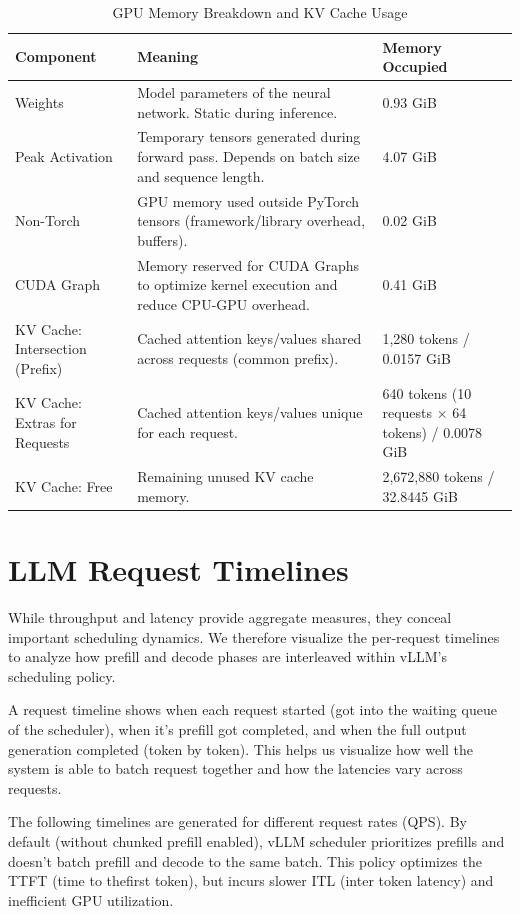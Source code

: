 \begin{table}[H]
\centering
\begin{tabular}{|p{4cm}|p{8cm}|p{3cm}|}
\hline
\textbf{Component} & \textbf{Meaning} & \textbf{Memory Occupied} \\
\hline
Weights & Model parameters of the neural network. Static during inference. & 0.93 GiB \\
\hline
Peak Activation & Temporary tensors generated during forward pass. Depends on batch size and sequence length. & 4.07 GiB \\
\hline
Non-Torch & GPU memory used outside PyTorch tensors (framework/library overhead, buffers). & 0.02 GiB \\
\hline
CUDA Graph & Memory reserved for CUDA Graphs to optimize kernel execution and reduce CPU-GPU overhead. & 0.41 GiB \\
\hline
KV Cache: Intersection (Prefix) & Cached attention keys/values shared across requests (common prefix). & 1,280 tokens / 0.0157 GiB \\
\hline
KV Cache: Extras for Requests & Cached attention keys/values unique for each request. & 640 tokens (10 requests × 64 tokens) / 0.0078 GiB \\
\hline
KV Cache: Free & Remaining unused KV cache memory. & 2,672,880 tokens / 32.8445 GiB \\
\hline
\end{tabular}
\caption{GPU Memory Breakdown and KV Cache Usage}
\label{tab:gpu_memory_breakdown}
\end{table}



\section{LLM Request Timelines}
While throughput and latency provide aggregate measures, they conceal important scheduling dynamics. We therefore visualize the per-request timelines to analyze how prefill and decode phases are interleaved within vLLM's scheduling policy.

A request timeline shows when each request started (got into the waiting queue of the scheduler), when it's prefill got completed, and when the full output generation completed (token by token). This helps us visualize how well the system is able to batch request together and how the latencies vary across requests.

The following timelines are generated for different request rates (QPS). By default (without chunked prefill enabled), vLLM scheduler \cite{vllm_chunked_prefill} prioritizes prefills and doesn't batch prefill and decode to the same batch. This policy optimizes the TTFT (time to thefirst token), but incurs slower ITL (inter token latency) and inefficient GPU utilization.



